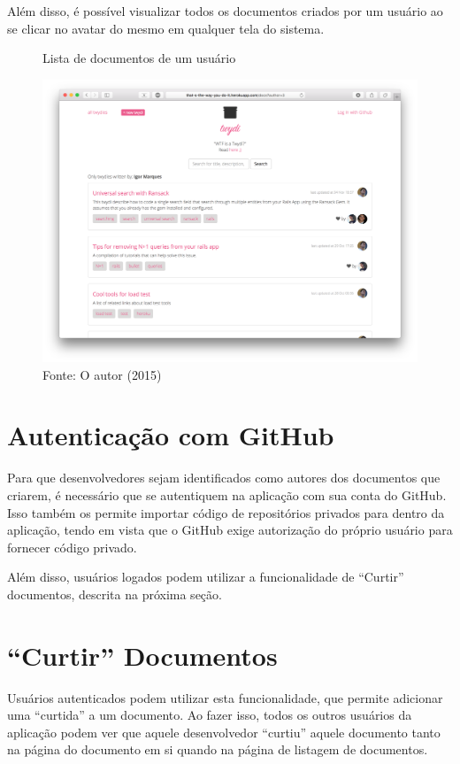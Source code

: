 Além disso, é possível visualizar todos os documentos criados por um usuário ao se clicar no avatar do mesmo em qualquer tela do sistema.

\begin{figure}[h]
	\centering
    \caption{Lista de documentos de um usuário}
    \includegraphics[width=15cm]{Imagens/print-by-user.png}
	\caption*{Fonte: O autor (2015)}
\end{figure}

\section{Autenticação com GitHub}

Para que desenvolvedores sejam identificados como autores dos documentos que criarem, é necessário que se autentiquem na aplicação com sua conta do GitHub. Isso também os permite importar código de repositórios privados para dentro da aplicação, tendo em vista que o GitHub exige autorização do próprio usuário para fornecer código privado.

Além disso, usuários logados podem utilizar a funcionalidade de ``Curtir'' documentos, descrita na próxima seção.

\section{``Curtir'' Documentos}

Usuários autenticados podem utilizar esta funcionalidade, que permite adicionar uma ``curtida'' a um documento. Ao fazer isso, todos os outros usuários da aplicação podem ver que aquele desenvolvedor ``curtiu'' aquele documento tanto na página do documento em si quando na página de listagem de documentos.

